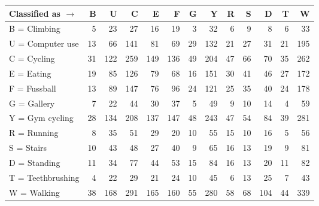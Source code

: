 \begin{tabular}{lrrrrrrrrrrrr}
\toprule
Classified as $\rightarrow$ &   B &    U &    C &    E &    F &   G &    Y &   R &   S &    D &   T &    W \\
\midrule
B = Climbing      &   5 &   23 &   27 &   16 &   19 &   3 &   32 &   6 &   9 &    8 &   6 &   33 \\
U = Computer use  &  13 &   66 &  141 &   81 &   69 &  29 &  132 &  21 &  27 &   31 &  21 &  195 \\
C = Cycling       &  31 &  122 &  259 &  149 &  136 &  49 &  204 &  47 &  66 &   70 &  35 &  262 \\
E = Eating        &  19 &   85 &  126 &   79 &   68 &  16 &  151 &  30 &  41 &   46 &  27 &  172 \\
F = Fussball      &  13 &   89 &  147 &   76 &   96 &  24 &  121 &  25 &  35 &   40 &  24 &  178 \\
G = Gallery       &   7 &   22 &   44 &   30 &   37 &   5 &   49 &   9 &  10 &   14 &   4 &   59 \\
Y = Gym cycling   &  28 &  134 &  208 &  137 &  147 &  48 &  243 &  47 &  54 &   84 &  39 &  281 \\
R = Running       &   8 &   35 &   51 &   29 &   20 &  10 &   55 &  15 &  10 &   16 &   5 &   56 \\
S = Stairs        &  10 &   43 &   48 &   27 &   40 &   9 &   65 &  16 &  13 &   19 &   9 &   81 \\
D = Standing      &  11 &   34 &   77 &   44 &   53 &  15 &   84 &  16 &  13 &   20 &  11 &   82 \\
T = Teethbrushing &   4 &   22 &   29 &   21 &   24 &  10 &   45 &   6 &  13 &   25 &   7 &   43 \\
W = Walking       &  38 &  168 &  291 &  165 &  160 &  55 &  280 &  58 &  68 &  104 &  44 &  339 \\
\bottomrule
\end{tabular}

